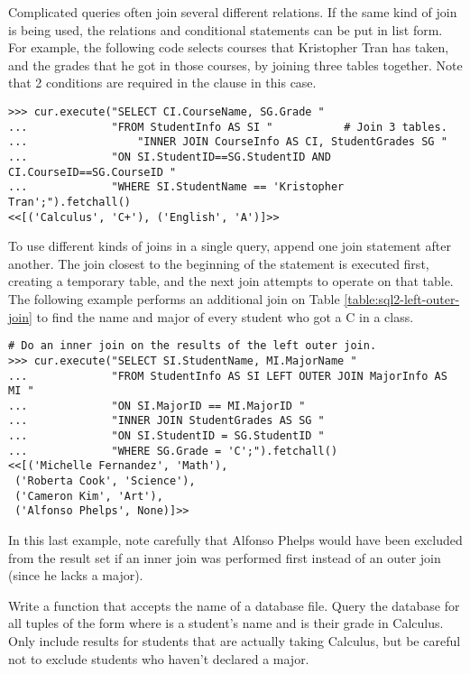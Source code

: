 Complicated queries often join several different relations.
If the same kind of join is being used, the relations and conditional statements can be put in list form.
For example, the following code selects courses that Kristopher Tran has taken, and the grades that he got in those courses, by joining three tables together.
Note that 2 conditions are required in the  clause in this case.

\begin{lstlisting}
>>> cur.execute("SELECT CI.CourseName, SG.Grade "
...             "FROM StudentInfo AS SI "           # Join 3 tables.
...                 "INNER JOIN CourseInfo AS CI, StudentGrades SG "
...             "ON SI.StudentID==SG.StudentID AND CI.CourseID==SG.CourseID "
...             "WHERE SI.StudentName == 'Kristopher Tran';").fetchall()
<<[('Calculus', 'C+'), ('English', 'A')]>>
\end{lstlisting}

To use different kinds of joins in a single query, append one join statement after another.
The join closest to the beginning of the statement is executed first, creating a temporary table, and the next join attempts to operate on that table.
The following example performs an additional join on Table \ref{table:sql2-left-outer-join} to find the name and major of every student who got a C in a class.

\begin{lstlisting}
# Do an inner join on the results of the left outer join.
>>> cur.execute("SELECT SI.StudentName, MI.MajorName "
...             "FROM StudentInfo AS SI LEFT OUTER JOIN MajorInfo AS MI "
...             "ON SI.MajorID == MI.MajorID "
...             "INNER JOIN StudentGrades AS SG "
...             "ON SI.StudentID = SG.StudentID "
...             "WHERE SG.Grade = 'C';").fetchall()
<<[('Michelle Fernandez', 'Math'),
 ('Roberta Cook', 'Science'),
 ('Cameron Kim', 'Art'),
 ('Alfonso Phelps', None)]>>
\end{lstlisting}

In this last example, note carefully that Alfonso Phelps would have been excluded from the result set if an inner join was performed first instead of an outer join (since he lacks a major).

\begin{problem} %
Write a function that accepts the name of a database file.
Query the database for all tuples of the form  where  is a student's name and  is their grade in Calculus.
Only include results for students that are actually taking Calculus, but be careful not to exclude students who haven't declared a major.
\end{problem}

